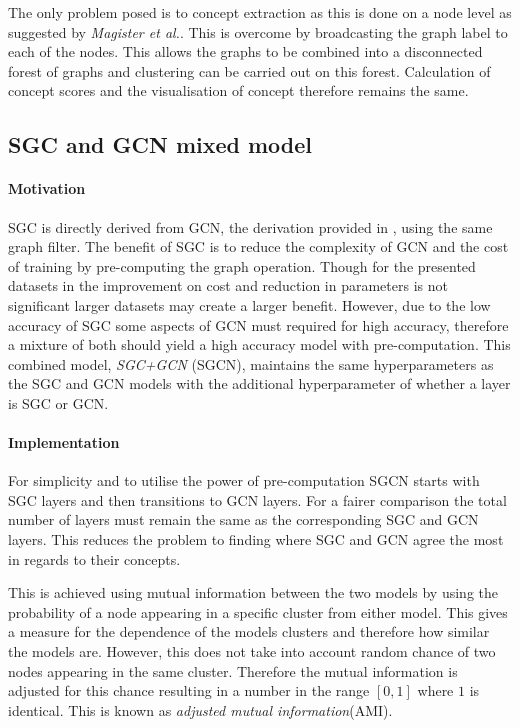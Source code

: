 The only problem posed is to concept extraction as this is done on a node level as suggested by \textit{Magister et al.}.
This is overcome by broadcasting the graph label to each of the nodes.
This allows the graphs to be combined into a disconnected forest of graphs and clustering can be carried out on this forest.
Calculation of concept scores and the visualisation of concept therefore remains the same.

\subsection{SGC and GCN mixed model}
\paragraph{Motivation}
SGC is directly derived from GCN, the derivation provided in , using the same graph filter.
The benefit of SGC is to reduce the complexity of GCN and the cost of training by pre-computing the graph operation.
Though for the presented datasets in  the improvement on cost and reduction in parameters is not significant larger datasets may create a larger benefit.
However, due to the low accuracy of SGC some aspects of GCN must required for high accuracy, therefore a mixture of both should yield a high accuracy model with pre-computation.
This combined model, \textit{SGC+GCN} (SGCN), maintains the same hyperparameters as the SGC and GCN models with the additional hyperparameter of whether a layer is SGC or GCN.

\paragraph{Implementation}
For simplicity and to utilise the power of pre-computation SGCN starts with SGC layers and then transitions to GCN layers.
For a fairer comparison the total number of layers must remain the same as the corresponding SGC and GCN layers.
This reduces the problem to finding where SGC and GCN agree the most in regards to their concepts.

This is achieved using mutual information between the two models by using the probability of a node appearing in a specific cluster from either model.
This gives a measure for the dependence of the models clusters and therefore how similar the models are.
However, this does not take into account random chance of two nodes appearing in the same cluster.
Therefore the mutual information is adjusted for this chance resulting in a number in the range $[0, 1]$ where $1$ is identical.
This is known as \emph{adjusted mutual information}(AMI).

